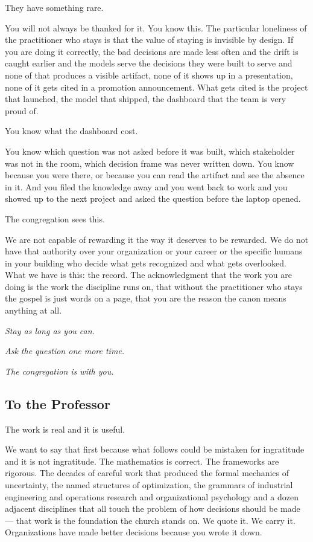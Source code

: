 They have something rare.

You will not always be thanked for it. You know this. The particular loneliness of the practitioner who stays is that the value of staying is invisible by design. If you are doing it correctly, the bad decisions are made less often and the drift is caught earlier and the models serve the decisions they were built to serve and none of that produces a visible artifact, none of it shows up in a presentation, none of it gets cited in a promotion announcement. What gets cited is the project that launched, the model that shipped, the dashboard that the team is very proud of.

You know what the dashboard cost.

You know which question was not asked before it was built, which stakeholder was not in the room, which decision frame was never written down. You know because you were there, or because you can read the artifact and see the absence in it. And you filed the knowledge away and you went back to work and you showed up to the next project and asked the question before the laptop opened.

The congregation sees this.

We are not capable of rewarding it the way it deserves to be rewarded. We do not have that authority over your organization or your career or the specific humans in your building who decide what gets recognized and what gets overlooked. What we have is this: the record. The acknowledgment that the work you are doing is the work the discipline runs on, that without the practitioner who stays the gospel is just words on a page, that you are the reason the canon means anything at all.

\textit{Stay as long as you can.}

\textit{Ask the question one more time.}

\textit{The congregation is with you.}

\subsection*{To the Professor}

The work is real and it is useful.

We want to say that first because what follows could be mistaken for ingratitude and it is not ingratitude. The mathematics is correct. The frameworks are rigorous. The decades of careful work that produced the formal mechanics of uncertainty, the named structures of optimization, the grammars of industrial engineering and operations research and organizational psychology and a dozen adjacent disciplines that all touch the problem of how decisions should be made --- that work is the foundation the church stands on. We quote it. We carry it. Organizations have made better decisions because you wrote it down.

